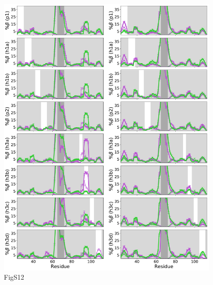 \documentclass[10pt,letterpaper]{article}
\begin{document}
\begin{figure}[!ht]
\includegraphics[scale=0.5,width=\textwidth,trim={0 0cm 0 0cm},clip]{./figures/S12.pdf}
\caption{{FigS12}}
\end{figure}
\end{document}
